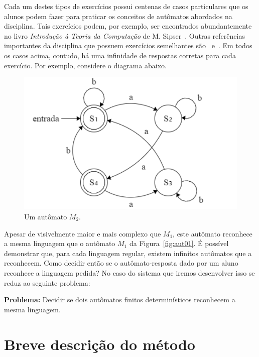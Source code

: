 \documentclass[
	12pt,				%
	openany,
	oneside,
	a4paper,			%
	english,			%
	brazil,				%
	]{abntex2}
\begin{document}
Cada um destes tipos de exercícios possui centenas de casos particulares que os alunos podem fazer para praticar os conceitos de autômatos abordados na disciplina. Tais exercícios podem, por exemplo, ser encontrados abundantemente no livro \textit{Introdução à Teoria da Computação} de M. Sipser~\cite{sipser}. Outras referências importantes da disciplina que possuem exercícios semelhantes são~\cite{ullman} e~\cite{linz}. Em todos os casos acima, contudo, há uma infinidade de respostas corretas para cada exercício. Por exemplo, considere o diagrama abaixo.

\begin{figure}[H]
	\vspace{-0.5cm}
	\centering
	\includegraphics[scale=.65]{aut02.png}
	\vspace{-0.2cm}
	\caption{Um autômato $M_2$.}
	\label{fig:aut02}
	\vspace{-0.5cm}
\end{figure}

Apesar de visivelmente maior e mais complexo que $M_1$, este autômato reconhece a mesma linguagem que o autômato $M_1$ da Figura~\ref{fig:aut01}. É possível demonstrar que, para cada linguagem regular, existem infinitos autômatos que a reconhecem. Como decidir então se o autômato-resposta dado por um aluno reconhece a linguagem pedida? No caso do sistema que iremos desenvolver isso se reduz ao seguinte problema:
\bigskip

\noindent \textbf{Problema:} Decidir se dois autômatos finitos determinísticos reconhecem a mesma linguagem.



\section {Breve descrição do método}
\end{document}
